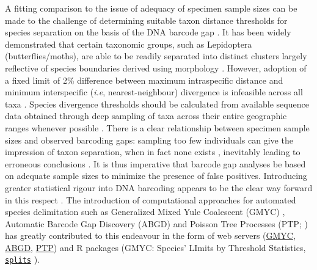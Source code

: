 A fitting comparison to the issue of adequacy of specimen sample sizes can be made to the challenge of determining suitable taxon distance thresholds for species separation on the basis of the DNA barcode gap \cite{meyer2005dna}. It has been widely demonstrated that certain taxonomic groups, such as Lepidoptera (butterflies/moths), are able to be readily separated into distinct clusters largely reflective of species boundaries derived using morphology \cite{candek2015dna}. However, adoption of a fixed limit of 2\% difference between maximum intraspecific distance and minimum interspecific (\textit{i.e}, nearest-neighbour) divergence is infeasible across all taxa \cite{collins2013seven, hebert2003barcoding}. Species divergence thresholds should be calculated from available sequence data obtained through deep sampling of taxa across their entire geographic ranges whenever possible \cite{young2017barcode}. There is a clear relationship between specimen sample sizes and observed barcoding gaps: sampling too few individuals can give the impression of taxon separation, when in fact none exists \cite{candek2015dna, dasmahapatra2010mitochondrial, hickerson2006dna, meyer2005dna, wiemers2007does}, inevitably leading to erroneous conclusions \cite{collins2013seven}. It is thus imperative that barcode gap analyses be based on adequate sample sizes to minimize the presence of false positives. Introducing greater statistical rigour into DNA barcoding appears to be the clear way forward in this respect \cite{candek2015dna, luo2015simulation, nielsen2006statistical, phillips2019incomplete}. The introduction of computational approaches for automated species delimitation such as Generalized Mixed Yule Coalescent (GMYC) \cite{fujisawa2013delimiting, monaghan2009accelerated, pons2006sequence}, Automatic Barcode Gap Discovery (ABGD) \cite{puillandre2011abgd} and Poisson Tree Processes (PTP; \cite{zhang2013general}) has greatly contributed to this endeavour in the form of web servers (\href{https://species.h-its.org/gmyc/}{GMYC}, \href{http://wwwabi.snv.jussieu.fr/public/abgd/abgdweb.html}{ABGD}, \href{https://species.h-its.org/ptp/}{PTP}) and R packages (GMYC: Species' LImits by Threshold Statistics, \href{https://r-forge.r-project.org/projects/splits/}{\tt splits} \cite{ezard2017splits}).

